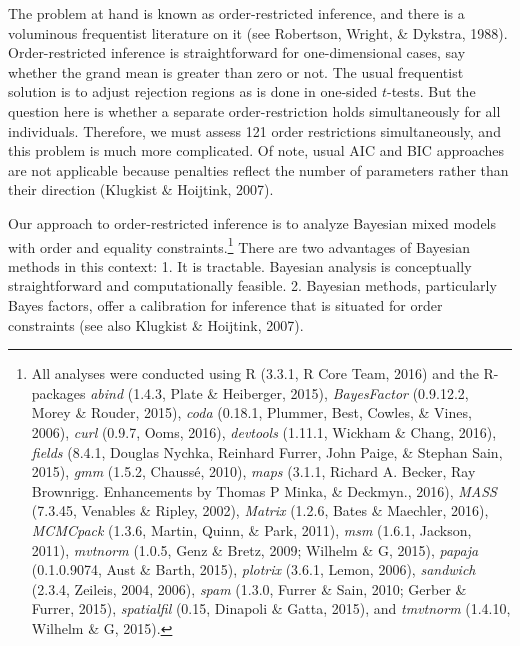 \documentclass[american,man]{apa6}
\begin{document}
The problem at hand is known as order-restricted inference, and there is
a voluminous frequentist literature on it (see Robertson, Wright, \&
Dykstra, 1988). Order-restricted inference is straightforward for
one-dimensional cases, say whether the grand mean is greater than zero
or not. The usual frequentist solution is to adjust rejection regions as
is done in one-sided \(t\)-tests. But the question here is whether a
separate order-restriction holds simultaneously for all individuals.
Therefore, we must assess 121 order restrictions simultaneously, and
this problem is much more complicated. Of note, usual AIC and BIC
approaches are not applicable because penalties reflect the number of
parameters rather than their direction (Klugkist \& Hoijtink, 2007).

Our approach to order-restricted inference is to analyze Bayesian mixed
models with order and equality constraints.\footnote{All analyses were
  conducted using R (3.3.1, R Core Team, 2016) and the R-packages
  \emph{abind} (1.4.3, Plate \& Heiberger, 2015), \emph{BayesFactor}
  (0.9.12.2, Morey \& Rouder, 2015), \emph{coda} (0.18.1, Plummer, Best,
  Cowles, \& Vines, 2006), \emph{curl} (0.9.7, Ooms, 2016),
  \emph{devtools} (1.11.1, Wickham \& Chang, 2016), \emph{fields}
  (8.4.1, Douglas Nychka, Reinhard Furrer, John Paige, \& Stephan Sain,
  2015), \emph{gmm} (1.5.2, Chauss{é}, 2010), \emph{maps} (3.1.1,
  Richard A. Becker, Ray Brownrigg. Enhancements by Thomas P Minka, \&
  Deckmyn., 2016), \emph{MASS} (7.3.45, Venables \& Ripley, 2002),
  \emph{Matrix} (1.2.6, Bates \& Maechler, 2016), \emph{MCMCpack}
  (1.3.6, Martin, Quinn, \& Park, 2011), \emph{msm} (1.6.1, Jackson,
  2011), \emph{mvtnorm} (1.0.5, Genz \& Bretz, 2009; Wilhelm \& G,
  2015), \emph{papaja} (0.1.0.9074, Aust \& Barth, 2015), \emph{plotrix}
  (3.6.1, Lemon, 2006), \emph{sandwich} (2.3.4, Zeileis, 2004, 2006),
  \emph{spam} (1.3.0, Furrer \& Sain, 2010; Gerber \& Furrer, 2015),
  \emph{spatialfil} (0.15, Dinapoli \& Gatta, 2015), and \emph{tmvtnorm}
  (1.4.10, Wilhelm \& G, 2015).} There are two advantages of Bayesian
methods in this context: 1. It is tractable. Bayesian analysis is
conceptually straightforward and computationally feasible. 2. Bayesian
methods, particularly Bayes factors, offer a calibration for inference
that is situated for order constraints (see also Klugkist \& Hoijtink,
2007).
\end{document}
